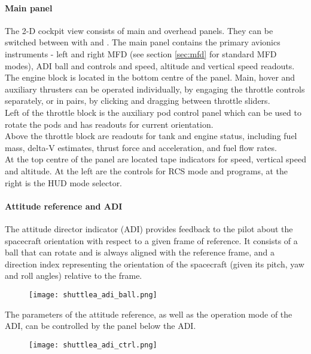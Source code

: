 \documentclass[Orbiter User Manual.tex]{subfiles}
\begin{document}
\paragraph{Main panel}
The 2-D cockpit view consists of main and overhead panels. They can be switched between with \Ctrl\UArrow and \Ctrl\DArrow. The main panel contains the primary avionics instruments - left and right MFD (see section \ref{sec:mfd} for standard MFD modes), ADI ball and controls and speed, altitude and vertical speed readouts.\\
The engine block is located in the bottom centre of the panel. Main, hover and auxiliary thrusters can be operated individually, by engaging the throttle controls separately, or in pairs, by clicking and dragging between throttle sliders.\\
Left of the throttle block is the auxiliary pod control panel which can be used to rotate the pods and has readouts for current orientation.\\
Above the throttle block are readouts for tank and engine status, including fuel mass, delta-V estimates, thrust force and acceleration, and fuel flow rates.\\
At the top centre of the panel are located tape indicators for speed, vertical speed and altitude. At the left are the controls for RCS mode and programs, at the right is the HUD mode selector.

\paragraph{Attitude reference and ADI}
The attitude director indicator (ADI) provides feedback to the pilot about the spacecraft orientation with respect to a given frame of reference. It consists of a ball that can rotate and is always aligned with the reference frame, and a direction index representing the orientation of the spacecraft (given its pitch, yaw and roll angles) relative to the frame.

\begin{figure}[H]
  \centering
  \texttt{[image: shuttlea\_adi\_ball.png]}
\end{figure}

\noindent
The parameters of the attitude reference, as well as the operation mode of the ADI, can be controlled by the panel below the ADI.

\begin{figure}[H]
  \centering
  \texttt{[image: shuttlea\_adi\_ctrl.png]}
\end{figure}
\end{document}
